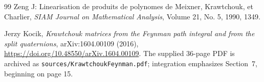 \begin{thebibliography}{99}
 Zeng J: Linearisation de produits de polynomes de Meixner, Krawtchouk, et Charlier, \emph{SIAM Journal on Mathematical Analysis}, Volume 21, No. 5, 1990, 1349.

Jerzy Kocik, \emph{Krawtchouk matrices from the Feynman path integral and
from the split quaternions}, arXiv:1604.00109 (2016),
\url{https://doi.org/10.48550/arXiv.1604.00109}.
The supplied 36-page PDF is archived as
\texttt{sources/KrawtchoukFeynman.pdf}; integration emphasizes Section~7, beginning on page 15.

\end{thebibliography}
